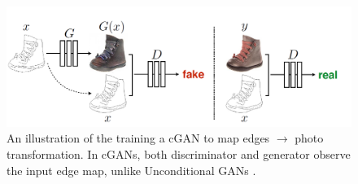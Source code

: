 \begin{figure}[H]
        \begin{center}
 	    \includegraphics[scale=0.30]{images/relatedWorks/CGAN.png}
	    \caption[An illustration of training a \ac{cGAN} to map edges $\rightarrow$	 photo transformation.]{An illustration of the training a \ac{cGAN} to map edges $\rightarrow$ photo transformation. In \acp{cGAN}, both discriminator and generator observe the input edge map, unlike Unconditional \acp{GAN} \cite{isola2018imagetoimage}.}
	    \label{fig:CGAN}
	    \end{center}
\end{figure}

